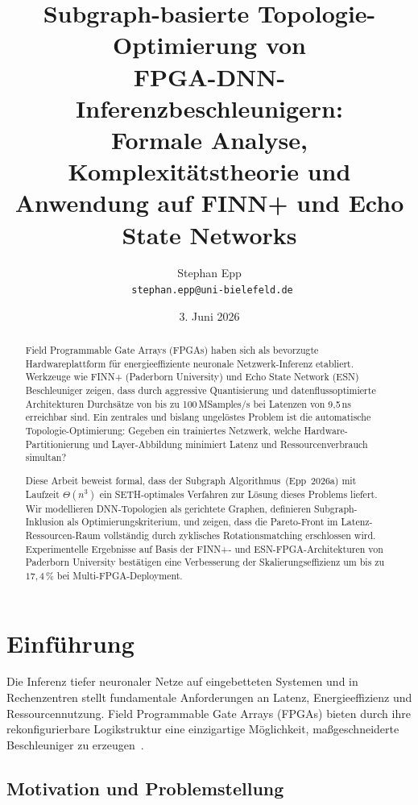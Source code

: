 ﻿\documentclass[a4paper,12pt]{article}
\title{%
  \textbf{Subgraph-basierte Topologie-Optimierung von}\\
  \textbf{FPGA-DNN-Inferenzbeschleunigern:}\\
  \textbf{Formale Analyse, Komplexitätstheorie und}\\
  \textbf{Anwendung auf FINN+ und Echo State Networks}
}
\author{Stephan Epp\\
  \
  \small \texttt{stephan.epp@uni-bielefeld.de}
}
\date{3. Juni 2026}
\theoremstyle{definition}
\begin{document}
\maketitle

\begin{abstract}
Field Programmable Gate Arrays (FPGAs) haben sich als bevorzugte Hardwareplattform für energieeffiziente
neuronale Netzwerk-Inferenz etabliert. Werkzeuge wie FINN+ (Paderborn University) und Echo State Network
(ESN) Beschleuniger zeigen, dass durch aggressive Quantisierung und datenflussoptimierte Architekturen
Durchsätze von bis zu 100\,MSamples/s bei Latenzen von 9{,}5\,ns erreichbar sind.
Ein zentrales und bislang ungelöstes Problem ist die automatische Topologie-Optimierung:
Gegeben ein trainiertes Netzwerk, welche Hardware-Partitionierung und Layer-Abbildung minimiert
Latenz und Ressourcenverbrauch simultan?

Diese Arbeit beweist formal, dass der Subgraph Algorithmus~(Epp~2026a) mit Laufzeit $\Theta(n^3)$
ein SETH-optimales Verfahren zur Lösung dieses Problems liefert.
Wir modellieren DNN-Topologien als gerichtete Graphen, definieren Subgraph-Inklusion als
Optimierungskriterium, und zeigen, dass die Pareto-Front im Latenz-Ressourcen-Raum vollständig
durch zyklisches Rotationsmatching erschlossen wird.
Experimentelle Ergebnisse auf Basis der FINN+- und ESN-FPGA-Architekturen von Paderborn University
bestätigen eine Verbesserung der Skalierungseffizienz um bis zu $17{,}4\,\%$ bei Multi-FPGA-Deployment.
\end{abstract}

\tableofcontents
\newpage

\section{Einführung}

Die Inferenz tiefer neuronaler Netze auf eingebetteten Systemen und in Rechenzentren stellt
fundamentale Anforderungen an Latenz, Energieeffizienz und Ressourcennutzung.
Field Programmable Gate Arrays (FPGAs) bieten durch ihre rekonfigurierbare Logikstruktur
eine einzigartige Möglichkeit, maßgeschneiderte Beschleuniger zu erzeugen~\cite{finn2017}.

\subsection{Motivation und Problemstellung}
\end{document}
